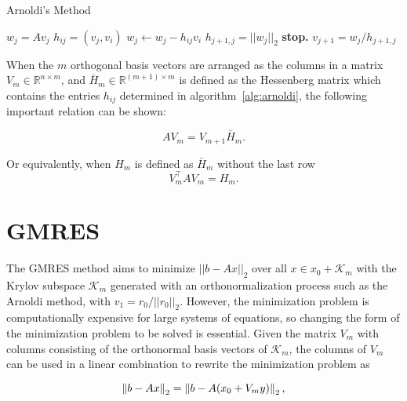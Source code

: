 \begin{algorithm}
	\caption{Arnoldi's Method}\label{alg:arnoldi}
	\begin{algorithmic}[1]
                \State $w_j = A v_j$
                    \State $h_{ij} = \left(v_j, v_i\right)$
                    \State $w_j \gets w_j - h_{ij}v_i$
                \EndFor
                \State $h_{j+1, j} = ||w_j||_2$
                    \State \textbf{stop.}
                \EndIf
                \State $v_{j+1} = w_j/h_{j+1, j}$
            \EndFor
		\EndProcedure
	\end{algorithmic}
\end{algorithm}

When the $m$ orthogonal basis vectors are arranged as the columns in a matrix $V_m \in \mathbb{R}^{n \times m}$, and $\bar{H}_m \in \mathbb{R}^{(m+1) \times m}$ is defined as the Hessenberg matrix which contains the entries $h_{ij}$ determined in algorithm~\ref{alg:arnoldi}, the following important relation can be shown:

\begin{equation}
    \label{eq:arnoldi_relation}
    A V_m = V_{m+1}\bar{H}_m.
\end{equation}

Or equivalently, when $H_m$ is defined as $\bar{H}_m$ without the last row
\begin{equation}
    \label{eq:arnoldi_relation2}
    V^\top_m A V_m = H_m.
\end{equation}

\section{GMRES}
The GMRES method aims to minimize $||b - Ax||_2$ over all $x \in x_0 + \mathcal{K}_m $ with the Krylov subspace $\mathcal{K}_m$ generated with an orthonormalization process such as the Arnoldi method, with $v_1 = r_0/||r_0||_2$. However, the minimization problem is computationally expensive for large systems of equations, so changing the form of the minimization problem to be solved is essential. Given the matrix $V_m$ with columns consisting of the orthonormal basis vectors of $\mathcal{K}_m$, the columns of $V_m$ can be used in a linear combination to rewrite the minimization problem as

\begin{equation}
    \left\lVert b - Ax\right\rVert_2  = \left\lVert b - A(x_0 + V_m y)\right\rVert_2,
\end{equation}

